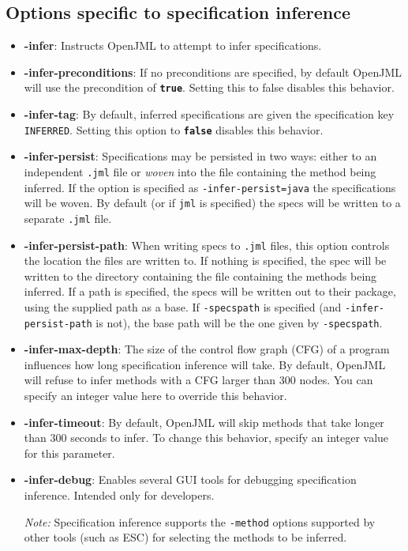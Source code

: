 \subsection{Options specific to specification inference}

\begin{itemize}[noitemsep,nolistsep]
    \item \textbf{-infer}: Instructs OpenJML to attempt to infer specifications. 
    \item \textbf{-infer-preconditions}: If no preconditions are specified, by default OpenJML will use the precondition of \texttt{\textbf{true}}. Setting this to false disables this behavior. 
    \item \textbf{-infer-tag}: By default, inferred specifications are given the specification key \texttt{INFERRED}. Setting this option to \texttt{\textbf{false}} disables this behavior. 
    \item \textbf{-infer-persist}: Specifications may be persisted in two ways: either to an independent \texttt{.jml} file or \textit{woven} into the file containing the method being inferred. If the option is specified as \texttt{-infer-persist=java} the specifications will be woven. By default (or if \texttt{jml} is specified) the specs will be written to a separate \texttt{.jml} file.

    \item \textbf{-infer-persist-path}: When writing specs to \texttt{.jml} files, this option controls the location the files are written to. If nothing is specified, the spec will be written to the directory containing the file containing the methods being inferred. If a path is specified, the specs will be written out to their package, using the supplied path as a base. If \texttt{-specspath} is specified (and \texttt{-infer-persist-path} is not), the base path will be the one given by \texttt{-specspath}.

    \item \textbf{-infer-max-depth}: The size of the control flow graph (CFG) of a program influences how long specification inference will take. By default, OpenJML will refuse to infer methods with a CFG larger than 300 nodes. You can specify an integer value here to override this behavior.

    \item \textbf{-infer-timeout}: By default, OpenJML will skip methods that take longer than 300 seconds to infer. To change this behavior, specify an integer value for this parameter. 
    
    \item \textbf{-infer-debug}: Enables several GUI tools for debugging specification inference. Intended only for developers. 

\textit{Note:} Specification inference supports the \texttt{-method} options supported by other tools (such as ESC) for selecting the methods to be inferred. 


\end{itemize}


